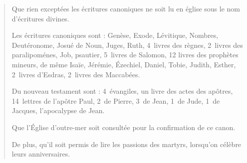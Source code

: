 \begin{quotation}
Que rien exceptées les écritures canoniques ne soit lu en église
sous le nom d’écritures divines.

Les écritures canoniques sont : Genèse, Exode, Lévitique,
Nombres, Deutéronome,
Josué de Noun, Juges, Ruth, 4~livres des règnes,
2~livres des paralipoménes,
Job, psautier, 5~livres de Salomon,
12 livres des prophètes mineurs,
de même Isaïe, Jérémie, Ézechiel, Daniel,
Tobie, Judith, Esther,
2~livres d’Esdras, 2~livres des Maccabées.

Du nouveau testament sont :
4~évangiles, un livre des actes des apôtres,
14~lettres de l’apôtre Paul, 2~de Pierre,
3~de Jean, 1~de Jude, 1~de Jacques,
l’apocalypse de Jean.

Que l’Église d'outre-mer soit consultée
pour la confirmation de ce canon.

De plus, qu'il soit permis de lire les passions des martyrs,
lorsqu'on célèbre leurs anniversaires.
\end{quotation}
